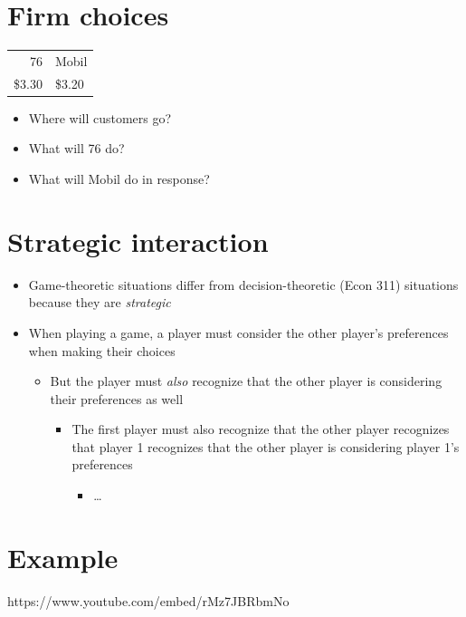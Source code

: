 \documentclass[11pt]{article}
\begin{document}
\section*{Firm choices}
\label{sec:orgd35dda5}
\begin{center}
\begin{tabular}{rl}
76 & Mobil\\
\$3.30 & \$3.20\\
\end{tabular}
\end{center}
\begin{itemize}
\item Where will customers go?
\item What will 76 do?
\item What will Mobil do in response?
\end{itemize}

\section*{Strategic interaction}
\label{sec:orgc176083}
\begin{itemize}
\item Game-theoretic situations differ from decision-theoretic (Econ 311) situations because they are \emph{strategic}
\item When playing a game, a player must consider the other player's preferences when making their choices
\begin{itemize}
\item But the player must \emph{also} recognize that the other player is considering their preferences as well
\begin{itemize}
\item The first player must also recognize that the other player recognizes that player 1 recognizes that the other player is considering player 1's preferences
\begin{itemize}
\item \ldots{}

\end{itemize}
\end{itemize}
\end{itemize}
\end{itemize}

\section*{Example}
https://www.youtube.com/embed/rMz7JBRbmNo
\end{document}
